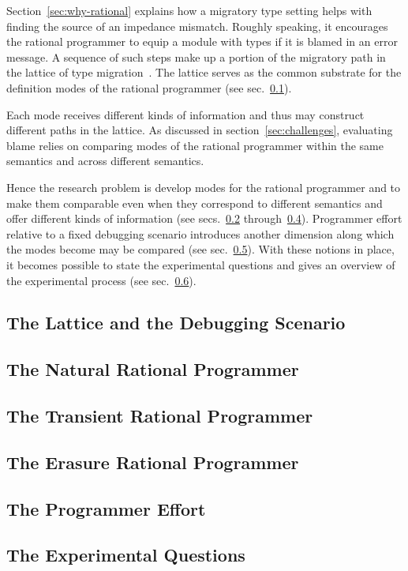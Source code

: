 
Section~\ref{sec:why-rational} explains how a migratory type setting helps with
finding the source of an impedance mismatch. Roughly speaking, it encourages the
rational programmer to equip a module with types if it is blamed in an error
message. A sequence of such steps make up a portion of the migratory path in the
lattice of type migration~\cite{tfgnvf-popl-2016}. The lattice serves as the
common substrate for the definition modes of the rational programmer (see
sec.~\ref{sub:stuff}).

Each mode receives different kinds of information and thus may construct
different paths in the lattice. As discussed in section~\ref{sec:challenges},
evaluating blame relies on comparing modes of the rational programmer
within the same semantics and across different semantics.  

Hence the research problem is develop modes for the rational programmer and to make
them comparable even when they correspond to different semantics and offer
different kinds of information (see secs.~\ref{sub:natural}
through~\ref{sub:erasure}). Programmer effort relative to a fixed debugging
scenario introduces another dimension along which the modes become may be
compared (see sec.~\ref{sub:effort}). With these notions in place, it
becomes possible to state the experimental questions and gives an overview of
the experimental process (see sec.~\ref{sub:experiment}).

\def\rsub#1#2{\subsection{#2} \label{sub:#1} }

\rsub{stuff}     {The Lattice and the Debugging Scenario} 
\rsub{natural}   {The Natural Rational Programmer} 
\rsub{transient} {The Transient Rational Programmer} 
\rsub{erasure}   {The Erasure Rational Programmer} 
\rsub{effort}    {The Programmer Effort} \label{subsec:effort}
\rsub{experiment}{The Experimental Questions} 
